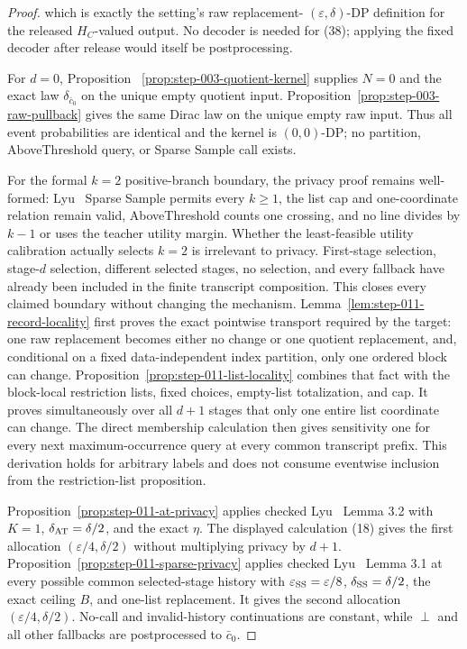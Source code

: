 \begin{proof}
which is exactly the setting's raw replacement-
\((\varepsilon,\delta)\)-DP definition for the released \(H_C\)-valued
output. No decoder is needed for (38); applying the fixed decoder after
release would itself be postprocessing.

For \(d=0\), Proposition
~\ref{prop:step-003-quotient-kernel} supplies \(N=0\) and the exact law
\(\delta_{\bar c_0}\) on the unique empty quotient input. Proposition~\ref{prop:step-003-raw-pullback} gives the same Dirac law on the
unique empty raw input. Thus all event probabilities are identical and the
kernel is \((0,0)\)-DP; no partition, AboveThreshold query, or Sparse Sample
call exists.

For the formal \(k=2\) positive-branch boundary, the privacy proof remains
well-formed: Lyu~\citep{lyu2025} Sparse Sample permits every \(k\geq1\), the list cap and
one-coordinate relation remain valid, AboveThreshold counts one crossing,
and no line divides by \(k-1\) or uses the teacher utility margin. Whether
the  least-feasible utility calibration actually selects \(k=2\)
is irrelevant to privacy. First-stage selection, stage-\(d\) selection,
different selected stages, no selection, and every fallback have already
been included in the finite transcript composition. This closes every
claimed boundary without changing the mechanism. 
Lemma~\ref{lem:step-011-record-locality} first proves the exact pointwise
transport required by the target: one raw replacement becomes either no
change or one quotient replacement, and, conditional on a fixed
data-independent index partition, only one ordered block can change.
Proposition~\ref{prop:step-011-list-locality} combines that fact with the
 block-local restriction lists, fixed choices, empty-list
totalization, and cap. It proves simultaneously over all \(d+1\) stages
that only one entire list coordinate can change. The direct membership
calculation then gives sensitivity one for every next maximum-occurrence
query at every common transcript prefix. This derivation holds for arbitrary
labels and does not consume eventwise inclusion from the restriction-list
proposition.

Proposition~\ref{prop:step-011-at-privacy} applies checked Lyu~\citep{lyu2025} Lemma 3.2
with \(K=1\), \(\delta_{\rm AT}=\delta/2\), and the exact  \(\eta\).
The displayed calculation (18) gives the first allocation
\((\varepsilon/4,\delta/2)\) without multiplying privacy by \(d+1\).
Proposition~\ref{prop:step-011-sparse-privacy} applies checked Lyu~\citep{lyu2025} Lemma 3.1
at every possible common selected-stage history with
\(\varepsilon_{\rm SS}=\varepsilon/8\),
\(\delta_{\rm SS}=\delta/2\), the exact ceiling \(B\), and one-list
replacement. It gives the second allocation
\((\varepsilon/4,\delta/2)\). No-call and invalid-history continuations are
constant, while \(\perp\) and all other fallbacks are postprocessed to
\(\bar c_0\).


\end{proof}
